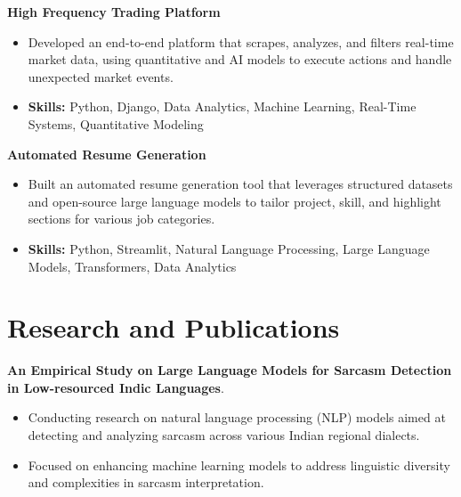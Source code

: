 \documentclass[a4paper,11pt]{article}
\begin{document}
\vspace{1mm}
  \textbf{High Frequency Trading Platform  }
\vspace{-1.5mm} %
\begin{itemize}
  \item Developed an end-to-end platform that scrapes, analyzes, and filters real-time market data, using quantitative and AI models to execute actions and handle unexpected market events.
\vspace{-3mm}
  \item \textbf{Skills:} Python, Django, Data Analytics, Machine Learning, Real-Time Systems, Quantitative Modeling
\end{itemize}


\vspace{1mm}
   \textbf{Automated Resume Generation }
\vspace{-1.5mm} %
\begin{itemize}
  \item Built an automated resume generation tool that leverages structured datasets and open-source large language models to tailor project, skill, and highlight sections for various job categories.
\vspace{-3mm}
  \item \textbf{Skills:} Python, Streamlit, Natural Language Processing, Large Language Models, Transformers, Data Analytics
\end{itemize}



\section{\textbf{Research and Publications} \hfill }
\vspace{1mm}
  \textbf{An Empirical Study on Large Language Models for Sarcasm Detection in Low-resourced Indic Languages}.
\vspace{-1mm} %
\begin{itemize}
  \item Conducting research on natural language processing (NLP) models aimed at detecting and analyzing sarcasm across various Indian regional dialects.
\vspace{-3mm}
  \item Focused on enhancing machine learning models to address linguistic diversity and complexities in sarcasm interpretation.
\end{itemize}
\end{document}

